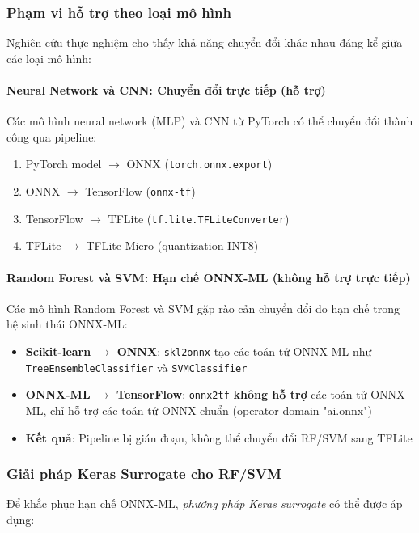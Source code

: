 \subsubsection{Phạm vi hỗ trợ theo loại mô hình}
Nghiên cứu thực nghiệm cho thấy khả năng chuyển đổi khác nhau đáng kể giữa các loại mô hình:

\paragraph{Neural Network và CNN: Chuyển đổi trực tiếp (hỗ trợ)}
Các mô hình neural network (MLP) và CNN từ PyTorch có thể chuyển đổi thành công qua pipeline:
\begin{enumerate}
    \item PyTorch model $\rightarrow$ ONNX (\texttt{torch.onnx.export})
    \item ONNX $\rightarrow$ TensorFlow (\texttt{onnx-tf})
    \item TensorFlow $\rightarrow$ TFLite (\texttt{tf.lite.TFLiteConverter})
    \item TFLite $\rightarrow$ TFLite Micro (quantization INT8)
\end{enumerate}

\paragraph{Random Forest và SVM: Hạn chế ONNX-ML (không hỗ trợ trực tiếp)}
Các mô hình Random Forest và SVM gặp rào cản chuyển đổi do hạn chế trong hệ sinh thái ONNX-ML:
\begin{itemize}
    \item \textbf{Scikit-learn $\rightarrow$ ONNX}: \texttt{skl2onnx} tạo các toán tử ONNX-ML như \texttt{TreeEnsembleClassifier} và \texttt{SVMClassifier}
    \item \textbf{ONNX-ML $\rightarrow$ TensorFlow}: \texttt{onnx2tf} \textbf{không hỗ trợ} các toán tử ONNX-ML, chỉ hỗ trợ các toán tử ONNX chuẩn (operator domain "ai.onnx")
    \item \textbf{Kết quả}: Pipeline bị gián đoạn, không thể chuyển đổi RF/SVM sang TFLite
\end{itemize}

\subsubsection{Giải pháp Keras Surrogate cho RF/SVM}
Để khắc phục hạn chế ONNX-ML, \textit{phương pháp Keras surrogate} có thể được áp dụng:

